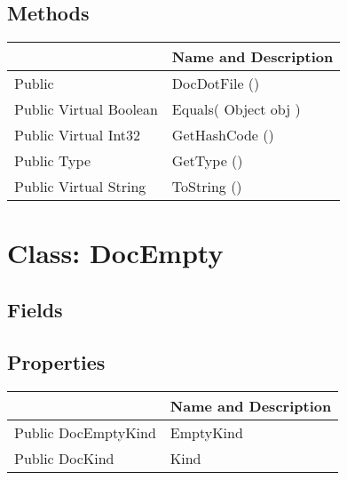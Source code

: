 \documentclass[11pt, oneside, a4paper]{book}
\begin{document}
\subsection{Methods}
\begin{center}
\begin{tabular}{| p{3cm} | p{12cm} | }
\hline
\textbf{ } & \textbf{ Name and Description}\\
\hline
 Public  &  DocDotFile ()\hypertarget{SoftwareEngineeringTools.{}Documentation.{}DocDotFile.{}DocDotFile}{}\\
\hline
 Public  Virtual  Boolean &  Equals(\hypertarget{SoftwareEngineeringTools.{}Documentation.{}DocDotFile.{}Equals\_Object}{} Object  obj  )\\
\hline
 Public  Virtual  Int32 &  GetHashCode ()\hypertarget{SoftwareEngineeringTools.{}Documentation.{}DocDotFile.{}GetHashCode}{}\\
\hline
 Public  Type &  GetType ()\hypertarget{SoftwareEngineeringTools.{}Documentation.{}DocDotFile.{}GetType}{}\\
\hline
 Public  Virtual  String &  ToString ()\hypertarget{SoftwareEngineeringTools.{}Documentation.{}DocDotFile.{}ToString}{}\\
\hline
\end{tabular}
\end{center}
 


\hypertarget{SoftwareEngineeringTools.{}Documentation.{}DocEmpty}{}
\section{Class: DocEmpty}

\subsection{Fields}

\subsection{Properties}
\begin{center}
\begin{tabular}{| p{3cm} | p{12cm} | }
\hline
\textbf{ } & \textbf{ Name and Description}\\
\hline
 Public  DocEmptyKind &  EmptyKind\hypertarget{SoftwareEngineeringTools.{}Documentation.{}DocEmpty.{}EmptyKind}{}\\
\hline
 Public  DocKind &  Kind\hypertarget{SoftwareEngineeringTools.{}Documentation.{}DocEmpty.{}Kind}{}\\
\hline
\end{tabular}
\end{center}
\end{document}
